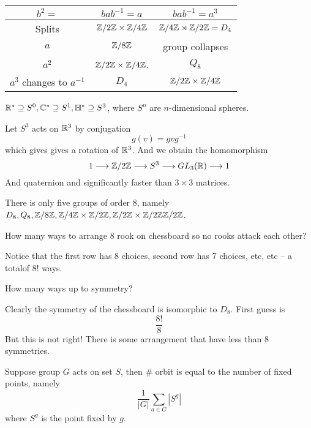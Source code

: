 \begin{center}
	\begin{tabular}{c|c|c}
	$b^2 = $ & $bab^{-1} = a$ & $bab^{-1} = a^{3}$ \\
	\hline
	Splits & $\mathbb Z/ 2 \mathbb Z \times \mathbb Z/ 4 \mathbb Z$ & $\mathbb Z/ 4 \mathbb Z \rtimes \mathbb Z/ 2 \mathbb Z = D_4$ \\
	$a$ & $\mathbb Z/ 8 \mathbb Z$ & group collapses \\
	$a^2$ & $\mathbb Z/ 2 \mathbb Z \times \mathbb Z/ 4 \mathbb Z$. & $Q_8$ \\
	$a^3$ changes to $a^{-1}$ & $D_4$ & $\mathbb Z/ 2 \mathbb Z \times \mathbb Z/ 4 \mathbb Z $
\end{tabular}
\end{center}
\begin{remark}
	$\mathbb R^* \supseteq S^0, \mathbb C^* \supseteq S^1, \mathbb H^* \supseteq S^3$, where $S^n$ are $n$-dimensional spheres.
\end{remark}
\begin{remark}
	Let $S^3$ acts on $\mathbb R^3$ by conjugation
	\[g(v) = gvg^{-1}\] which gives gives a rotation of $\mathbb R^3$. And we obtain the homomorphism
	\[ 1 \longrightarrow \mathbb Z/ 2 \mathbb Z \longrightarrow S^3 \longrightarrow GL_3(\mathbb R) \longrightarrow 1\]
	And quaternion and significantly faster than $3 \times 3$ matrices.
\end{remark}
\begin{remark}
	There is only five groups of order $8$, namely $D_8, Q_8, \mathbb Z /8 \mathbb Z,\mathbb Z/ 4 \mathbb Z \times \mathbb Z/ 2 \mathbb Z , \mathbb Z/ 2 \mathbb Z \times \mathbb Z/ 2 \mathbb Z \mathbb Z/ 2 \mathbb Z$.
\end{remark}
\begin{problem}
	How many ways to arrange 8 rook on chessboard so no rooks attack each other?
\end{problem}
\begin{answer}
	Notice that the first row has 8 choices, second row has 7 choices, etc, etc -- a totalof $8!$ ways.
\end{answer}
\begin{problem}
	How many ways up to symmetry?
\end{problem}
\begin{answer}
	Clearly the symmetry of the chessboard is isomorphic to $D_8$. First guess is
	\[ \frac{8!}{8}\]
	But this is not right! There is some arrangement that have less than $8$ symmetries.
\end{answer}
\begin{theorem}
	Suppose group $G$ acts on set $S$, then $\#$ orbit is equal to the number of fixed points, namely 
	\[ \frac{1}{|G|} \sum_{a \in G} |S^g|\]
	where $S^g$ is the point fixed by $g$.
\end{theorem}
